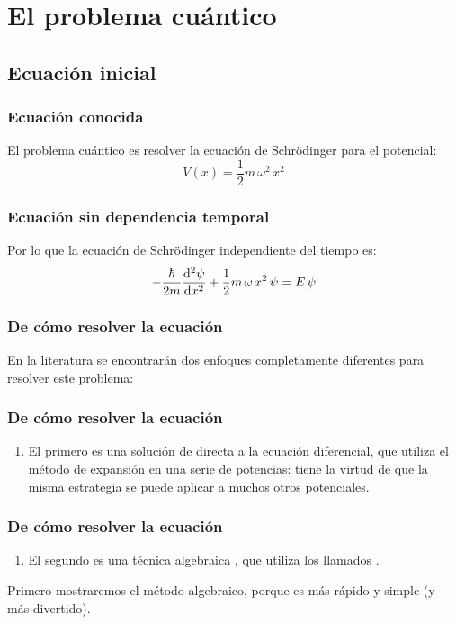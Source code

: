 \documentclass[12pt]{beamer}
\begin{document}
\section{El problema cuántico}
\subsection{Ecuación inicial}

\begin{frame}
\frametitle{Ecuación conocida}
El problema cuántico es resolver la ecuación de Schrödinger para el potencial:
\pause
\begin{equation}
V (x) = \dfrac{1}{2} m \, \omega^{2} \, x^{2}
\label{eq:ecuacion_02_038}
\end{equation}
\end{frame}
\begin{frame}
\frametitle{Ecuación sin dependencia temporal}
Por lo que la ecuación de Schrödinger independiente del tiempo es:
\pause
\begin{equation}
- \dfrac{\hbar}{2 m} \dv[2]{\psi}{x} + \dfrac{1}{2} m \, \omega \, x^{2} \, \psi = E \, \psi
\label{eq:ecuacion_02_039}
\end{equation}
\end{frame}
\begin{frame}
\frametitle{De cómo resolver la ecuación}
En la literatura se encontrarán dos enfoques completamente diferentes para resolver este problema:
\end{frame}
\begin{frame}
\frametitle{De cómo resolver la ecuación}
\begin{enumerate}[<+->]
\item El primero es una solución de  directa a la ecuación diferencial, que utiliza el método de expansión en una serie de potencias: \pause tiene la virtud de que la misma estrategia se puede aplicar a muchos otros potenciales.
\seti
\end{enumerate}
\end{frame}
\begin{frame}
\frametitle{De cómo resolver la ecuación}
\begin{enumerate}[<+->]
\conti
\item El segundo es una técnica algebraica , que utiliza los llamados .
\end{enumerate}
\pause
Primero mostraremos el método algebraico, porque es más rápido y simple (y más divertido).
\end{frame}
\end{document}
